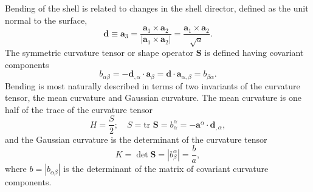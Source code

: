 \documentclass[
pre,
 twocolumn,
amsmath,
amssymb
]{revtex4}
\begin{document}
Bending of the shell is related to changes in the shell director, defined as the unit normal to the surface,
%
\begin{equation} 
\bm{d} \equiv \bm{a}_{3} 
= \frac{\bm{a}_1 \times \bm{a}_2}{|\bm{a}_1\times \bm{a}_2|} 
= \frac{\bm{a}_1 \times \bm{a}_2}{\sqrt{a}} . 
\end{equation}
%
The symmetric curvature tensor or shape operator $\mathbf{S}$ is
defined having covariant components
\begin{equation}\label{eq:curvature-tensor}
  b_{\alpha\beta}  = -\bm{d}_{,\alpha}\cdot\bm{a}_{\beta} = \bm{d} \cdot \bm{a}_{\alpha,\beta} = b_{\beta\alpha}.
\end{equation}
Bending is most naturally described in terms of two invariants of the
curvature tensor, the mean curvature and Gaussian curvature.  The mean
curvature is one half of the trace of the curvature tensor
\begin{equation}\label{eq:mean-curvature-1}
  H = \frac{S}{2}; \quad S = \text{tr }\mathbf{S} =
  b^{\alpha}_{\alpha} = -\bm{a}^{\alpha} \cdot
  \bm{d}_{,\alpha} ,
\end{equation}
and the Gaussian curvature is the determinant of the curvature
tensor
\begin{equation}\label{eq:G-curvature}
  K = \det\mathbf{S} = | b^{\alpha}_{\beta} | = \frac{b}{a} ,
\end{equation}
where $b = |b_{\alpha\beta}|$ is the determinant of the matrix of
covariant curvature components.


\vfill

\end{document}

